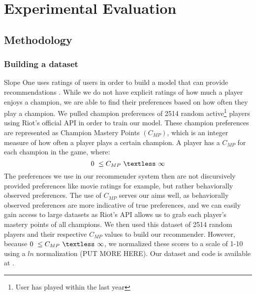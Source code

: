 \documentclass [11pt]{IEEEtran}
\begin{document}
\section{Experimental Evaluation}
\subsection{Methodology}
\subsubsection{Building a dataset}
Slope One uses ratings of users in order to build a model that can provide recommendations \cite{Lemire_2005}. While we do not have explicit ratings of how much a player enjoys a champion, we are able to find their preferences based on how often they play a champion. We pulled champion preferences of 2514 random active\footnote{User has played within the last year} players using Riot’s official API \cite{riotapi} in order to train our model. These champion preferences are represented as Champion Mastery Points $(C_{MP})$, which is an integer measure of how often a player plays a certain champion. A player has a $C_{MP}$ for each champion in the game, where: 
$$
0 \ \leq C_{MP} \ \textless \ \infty
$$
The preferences we use in our recommender system then are not discursively provided preferences like movie ratings for example, but rather behaviorally observed preferences. The use of $C_{MP}$ serves our aims well, as behaviorally observed preferences are more indicative of true preferences, and we can easily gain access to large datasets as Riot's API \cite{riotapi} allows us to grab each player's mastery points of all champions. We then used this dataset of 2514 random players and their respective $C_{MP}$ values to build our recommender. However, because $0 \ \leq C_{MP} \ \textless \ \infty$, we normalized these scores to a scale of 1-10 using a $ln$ normalization (PUT MORE HERE). Our dataset and code is available at \cite{github}. 
\end{document}
